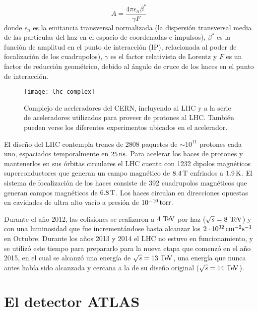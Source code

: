 \begin{equation}
  A = \frac{4\pi \epsilon_n \beta^{*}}{\gamma F}
\end{equation}
%
donde $\epsilon_n$ es la emitancia transversal normalizada (la dispersión
transversal media de las partículas del haz en el espacio de coordenadas e
impulsos), $\beta^{*}$ es la función de amplitud en el punto de interacción
(IP), relacionada al poder de focalización de los cuadrupolos), $\gamma$ es el
factor relativista de Lorentz y $F$ es un factor de reducción geométrico, debido
al ángulo de cruce de los haces en el punto de interacción.

\begin{figure}[!htb]
  \centering

  \texttt{[image: lhc\_complex]}

  \caption{Complejo de aceleradores del CERN, incluyendo al LHC y a la serie
    de aceleradores utilizados para proveer de protones al LHC. También pueden verse
    los diferentes experimentos ubicados en el acelerador.}
  \label{fig:lhc_complex}

\end{figure}

El diseño del LHC contempla trenes de 2808 paquetes de $\sim 10^{11}$ protones cada uno,
espaciados temporalmente en $\unit[25]{ns}$.
Para acelerar los haces de protones y mantenerlos en sus órbitas circulares el
LHC cuenta con 1232 dipolos magnéticos superconductores que generan un campo
magnético de $\unit[8.4]{T}$ enfriados a $\unit[1.9]{K}$. El sistema de focalización de los haces
consiste de 392 cuadrupolos magnéticos que generan campos magnéticos de $\unit[6.8]{T}$.
Los haces circulan en direcciones opuestas en cavidades de ultra alto vacío
a presión de $\unit[10^{-10}]{torr}$.

Durante el año 2012, las colisiones se realizaron a $4\TeV$ por haz ($\sqrt{s} =
8 \TeV$) y con una luminosidad que fue incrementándose hasta alcanzar los
$\unit[2 \cdot 10^{32}]{cm^{-2}s^{-1}}$ en Octubre. Durante los a\~nos 2013 y 2014
el LHC no estuvo en funcionamiento, y se utilizó este tiempo para prepararlo para
la nueva etapa que comenzó en el a\~no 2015, en el cual se alcanzó una energía de $\sqrt{s} = 13 \tev$,
una energía que nunca antes había sido alcanzada y cercana a la de su diseño
original ($\sqrt{s} = 14 \tev$).




\section{El detector ATLAS}

